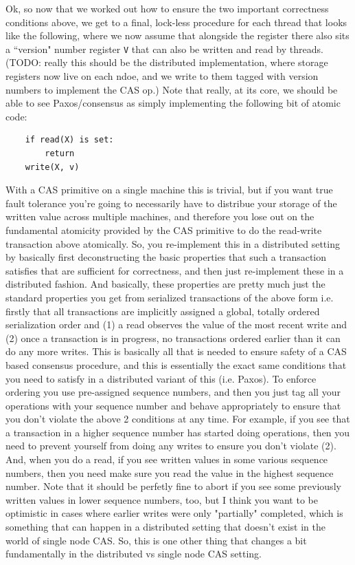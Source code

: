 \documentclass[10pt,a4paper]{article}
\begin{document}
Ok, so now that we worked out how to ensure the two important correctness conditions above, we get to a final, lock-less procedure for each thread that looks like the following, where we now assume that alongside the register there also sits a ``version" number register \verb|V| that can also be written and read by threads. (TODO: really this should be the distributed implementation, where storage registers now live on each ndoe, and we write to them tagged with version numbers to implement the CAS op.) Note that really, at its core, we should be able to see Paxos/consensus as simply implementing the following bit of atomic code:
\begin{verbatim}
    if read(X) is set:
        return
    write(X, v)
\end{verbatim}
With a CAS primitive on a single machine this is trivial, but if you want true fault tolerance you're going to necessarily have to distribue your storage of the written value across multiple machines, and therefore you lose out on the fundamental atomicity provided by the CAS primitive to do the read-write transaction above atomically. So, you re-implement this in a distributed setting by basically first deconstructing the basic properties that such a transaction satisfies that are sufficient for correctness, and then just re-implement these in a distributed fashion. And basically, these properties are pretty much just the standard properties you get from serialized transactions of the above form i.e. firstly that all transactions are implicitly assigned a global, totally ordered serialization order and (1) a read observes the value of the most recent write and (2) once a transaction is in progress, no transactions ordered earlier than it can do any more writes. This is basically all that is needed to ensure safety of a CAS based consensus procedure, and this is essentially the exact same conditions that you need to satisfy in a distributed variant of this (i.e. Paxos). To enforce ordering you use pre-assigned sequence numbers, and then you just tag all your operations with your sequence number and behave appropriately to ensure that you don't violate the above 2 conditions at any time. For example, if you see that a transaction in a higher sequence number has started doing operations, then you need to prevent yourself from doing any writes to ensure you don't violate (2). And, when you do a read, if you see written values in some various sequence numbers, then you need make sure you read the value in the highest sequence number. Note that it should be perfetly fine to abort if you see some previously written values in lower sequence numbers, too, but I think you want to be optimistic in cases where earlier writes were only "partially" completed, which is something that can happen in a distributed setting that doesn't exist in the world of single node CAS. So, this is one other thing that changes a bit fundamentally in the distributed vs single node CAS setting.
\end{document}
